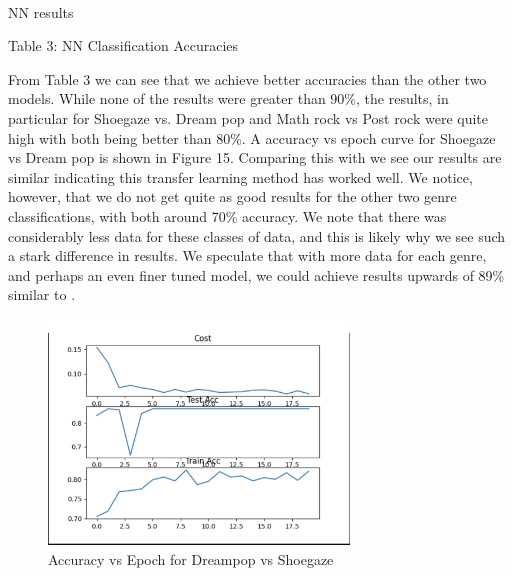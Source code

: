 \documentclass[letterpaper, 12 pt, conference]{ieeeconf}  %
\begin{document}
\newline \,\,
\par NN results 
\newline \,\,


\begin{center}
\caption{Table 3: NN Classification Accuracies}
\end{center}


\par From Table 3 we can see that we achieve better accuracies than the other two models. While none of the results were greater than 90\%, the results, in particular for Shoegaze vs. Dream pop and Math rock vs Post rock were quite high with both being better than 80\%. A accuracy vs epoch curve for Shoegaze vs Dream pop is shown in Figure 15. Comparing this with \cite{c7} we see our results are similar indicating this transfer learning method has worked well. We notice, however, that we do not get quite as good results for the other two genre classifications, with both around 70\% accuracy. We note that there was considerably less data for these classes of data, and this is likely why we see such a stark difference in results. We speculate that with more data for each genre, and perhaps an even finer tuned model, we could achieve results upwards of 89\% similar to \cite{c7}.


\begin{figure}
\includegraphics[width=8cm]{nn_train.png}
\caption{Accuracy vs Epoch for Dreampop vs Shoegaze}
\end{figure}
\end{document}
